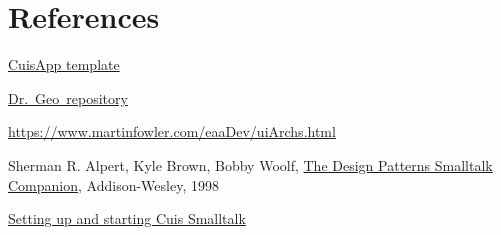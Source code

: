 \documentclass{beamer}
\newcommand{\drgeo}{Dr.~Geo}
\begin{document}
\section{References}
\begin{frame}
  \fontsize{10pt}{8pt}\selectfont
  \begin{thebibliography}{99}

    \href{https://github.com/hilaire/CuisApp}{CuisApp template}

    \href{https://github.com/hilaire/drgeo}{\drgeo\ repository}

    \href{GUI Architectures}{https://www.martinfowler.com/eaaDev/uiArchs.html}
    
    Sherman R. Alpert, Kyle Brown, Bobby Woolf,
    \href{https://dl.acm.org/doi/book/10.5555/275616}{The Design
      Patterns Smalltalk Companion}, Addison-Wesley, 1998
    
    \href{https://github.com/Cuis-Smalltalk/Cuis-Smalltalk-Dev/tree/master/Documentation}{Setting
      up and starting Cuis Smalltalk}

  \end{thebibliography}

  
\end{frame}
\end{document}
